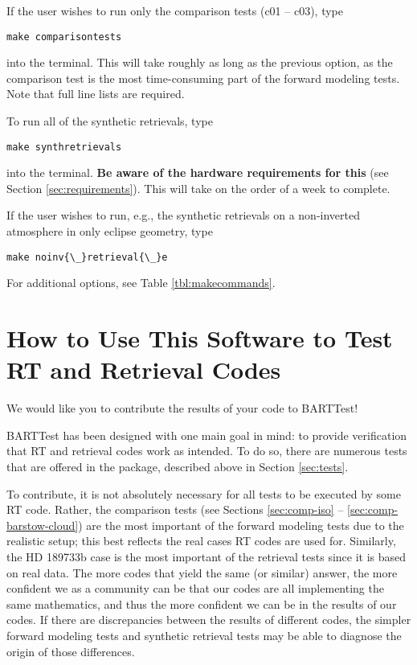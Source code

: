 \documentclass[letterpaper, 12pt]{article}
\begin{document}
If the user wishes to run only the comparison tests (c01 -- c03), type
\begin{verbatim}
make comparisontests
\end{verbatim}
into the terminal. This will take roughly as long as the previous option, as 
the comparison test is the most time-consuming part of the forward modeling 
tests. Note that full line lists are required.

To run all of the synthetic retrievals, type
\begin{verbatim}
make synthretrievals
\end{verbatim}
into the terminal. \textbf{Be aware of the hardware requirements for this} 
(see Section \ref{sec:requirements}). This will take on the order of a week to complete.

If the user wishes to run, e.g., the synthetic retrievals on a non-inverted 
atmosphere in only eclipse geometry, type
\begin{verbatim}
make noinv{\_}retrieval{\_}e
\end{verbatim}

For additional options, see Table \ref{tbl:makecommands}.

\section{How to Use This Software to Test RT and Retrieval Codes}
\label{sec:howto}
We would like you to contribute the results of your code to BARTTest! 

BARTTest has been designed with one main goal in mind: to provide verification 
that RT and retrieval codes work as intended. To do so, there are numerous 
tests that are offered in the package, described above in Section \ref{sec:tests}.

To contribute, it is not absolutely necessary for all tests to be executed by 
some RT code. Rather, the comparison tests (see Sections \ref{sec:comp-iso} -- 
\ref{sec:comp-barstow-cloud}) are the most important of the forward modeling 
tests due to the realistic setup; this best reflects the real cases RT codes 
are used for. Similarly, the HD 189733b case is the most important of the 
retrieval tests since it is based on real data. The more codes that yield the 
same (or similar) answer, the more confident we as a community can be that our 
codes are all implementing the same mathematics, and thus the more confident 
we can be in the results of our codes. If there are discrepancies between the 
results of different codes, the simpler forward modeling tests and synthetic 
retrieval tests may be able to diagnose the origin of those differences.
\end{document}
